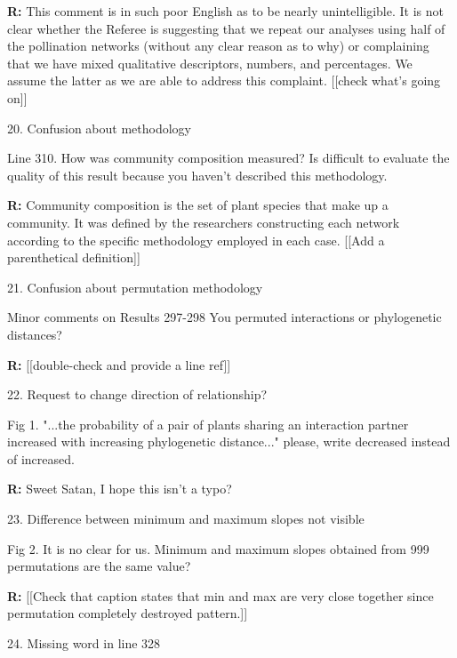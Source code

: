 \documentclass[12pt]{letter}
\newenvironment{refquote}{\bigskip \begin{it}}{\end{it}\smallskip}
\begin{document}
		\textbf{R:} This comment is in such poor English as to be nearly unintelligible. It is not clear whether the Referee is suggesting that we repeat our analyses using half of the pollination networks (without any clear reason as to why) or complaining that we have mixed qualitative descriptors, numbers, and percentages. We assume the latter as we are able to address this complaint. [[check what's going on]] 


	20. Confusion about methodology

		\begin{refquote}
			Line 310. How was community composition measured? Is difficult to evaluate the quality of this result because you haven't described this methodology.
		\end{refquote}

		\textbf{R:} Community composition is the set of plant species that make up a community. It was defined by the researchers constructing each network according to the specific methodology employed in each case. [[Add a parenthetical definition]]


	21. Confusion about permutation methodology

		\begin{refquote}
			Minor comments on Results
			297-298 You permuted interactions or phylogenetic distances?
		\end{refquote}


		\textbf{R:} [[double-check and provide a line ref]]


	22. Request to change direction of relationship?
		\begin{refquote}
			Fig 1. "...the probability of a pair of plants sharing an interaction partner increased with increasing phylogenetic distance..." please, write decreased instead of increased.
		\end{refquote}


		\textbf{R:} Sweet Satan, I hope this isn't a typo?


	23. Difference between minimum and maximum slopes not visible

		\begin{refquote}
			Fig 2. It is no clear for us. Minimum and maximum slopes obtained from 999 permutations are the same value?
		\end{refquote}


		\textbf{R:} [[Check that caption states that min and max are very close together since permutation completely destroyed pattern.]]


	24. Missing word in line 328
\end{document}
